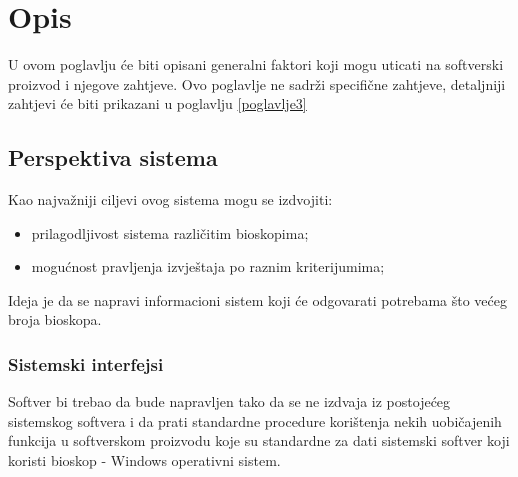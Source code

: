 \chapter{Opis}
U ovom poglavlju će biti opisani generalni faktori koji mogu uticati na softverski proizvod i njegove zahtjeve. 
Ovo poglavlje ne sadrži specifične zahtjeve, detaljniji zahtjevi će biti prikazani u poglavlju \ref{poglavlje3}
\section{Perspektiva sistema}

Kao najvažniji ciljevi ovog sistema mogu se izdvojiti:
\begin{itemize}
  \item prilagodljivost sistema različitim bioskopima;
  \item mogućnost pravljenja izvještaja po raznim kriterijumima;
\end{itemize}

Ideja je da se napravi informacioni sistem koji će odgovarati potrebama što većeg broja bioskopa.

\subsection{Sistemski interfejsi}

Softver bi trebao da bude napravljen tako da se ne izdvaja iz postojećeg sistemskog softvera i da prati standardne procedure korištenja nekih uobičajenih funkcija u softverskom proizvodu koje su standardne za dati sistemski softver koji koristi bioskop - Windows operativni sistem. 



